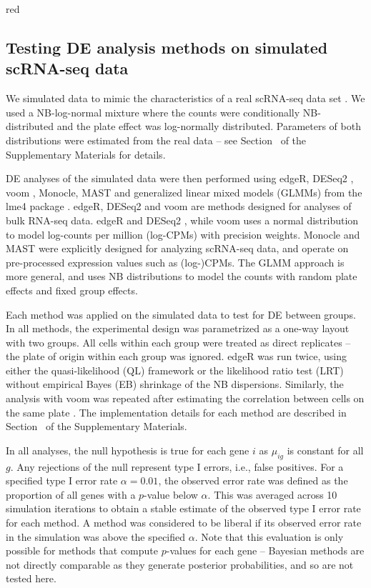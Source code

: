 \documentclass[oupdraft]{bio}
\begin{document}
\begin{color}{red}
\subsection{Testing DE analysis methods on simulated scRNA-seq data}
We simulated data to mimic the characteristics of a real scRNA-seq data set \citep{kolod2015single}.
We used a NB-log-normal mixture where the counts were conditionally NB-distributed and the plate effect was log-normally distributed.
Parameters of both distributions were estimated from the real data -- see Section~\suppsimulation{} of the Supplementary Materials for details.

DE analyses of the simulated data were then performed using edgeR, DESeq2 \citep{love2014moderated}, voom \citep{law2014voom}, Monocle, MAST \citep{finak2015mast} and generalized linear mixed models (GLMMs) from the lme4 package \citep{bates2015fitting}.
edgeR, DESeq2 and voom are methods designed for analyses of bulk RNA-seq data.
edgeR and DESeq2 , while voom uses a normal distribution to model log-counts per million (log-CPMs) with precision weights.
Monocle and MAST were explicitly designed for analyzing scRNA-seq data, and operate on pre-processed expression values such as (log-)CPMs.
The GLMM approach is more general, and uses NB distributions to model the counts with random plate effects and fixed group effects.
\end{color}

Each method was applied on the simulated data to test for DE between groups. 
In all methods, the experimental design was parametrized as a one-way layout with two groups.
All cells within each group were treated as direct replicates -- the plate of origin within each group was ignored.
edgeR was run twice, using either the quasi-likelihood (QL) framework \citep{lund2012detecting} 
    or the likelihood ratio test (LRT) \citep{mccarthy2012differential} without empirical Bayes (EB) shrinkage of the NB dispersions.
Similarly, the analysis with voom was repeated after estimating the correlation between cells on the same plate \citep{smyth2005use}.
The implementation details for each method are described in Section~\suppimplementation{} of the Supplementary Materials.

In all analyses, the null hypothesis is true for each gene $i$ as $\mu_{ig}$ is constant for all $g$.
Any rejections of the null represent type I errors, i.e., false positives.
For a specified type I error rate $\alpha = 0.01$, the observed error rate was defined as the proportion of all genes with a $p$-value below $\alpha$.
This was averaged across 10 simulation iterations to obtain a stable estimate of the observed type I error rate for each method. 
A method was considered to be liberal if its observed error rate in the simulation was above the specified $\alpha$.
Note that this evaluation is only possible for methods that compute $p$-values for each gene -- 
    Bayesian methods \citep{kharchenko2014bayesian} are not directly comparable as they generate posterior probabilities, and so are not tested here.
\end{document}

